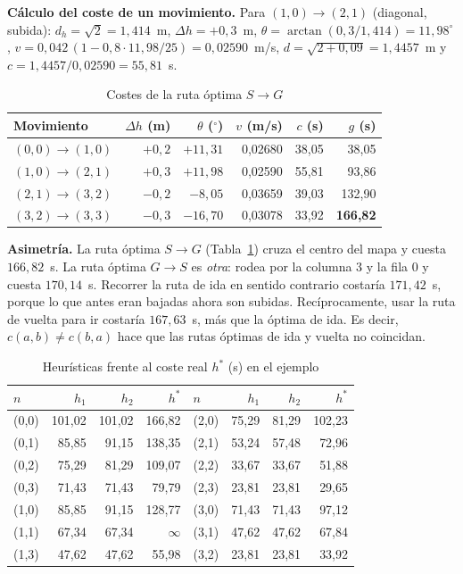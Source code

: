 \textbf{Cálculo del coste de un movimiento.} Para $(1,0) \to (2,1)$
(diagonal, subida):
$d_h = \sqrt{2} = 1{,}414$~m, $\Delta h = +0{,}3$~m,
$\theta = \arctan(0{,}3/1{,}414) = 11{,}98^\circ$,
$v = 0{,}042\,(1 - 0{,}8 \cdot 11{,}98/25) = 0{,}02590$~m/s,
$d = \sqrt{2 + 0{,}09} = 1{,}4457$~m y
$c = 1{,}4457/0{,}02590 = 55{,}81$~s.

\begin{table}[t]
  \centering
  \caption{Costes de la ruta óptima $S \to G$}
  \label{tab:ej3_ruta4x4}
  \footnotesize
  \begin{tabular}{@{}lrrrrr@{}}
    \toprule
    Movimiento & $\Delta h$ (m) & $\theta$ ($^\circ$) & $v$ (m/s) & $c$ (s) & $g$ (s) \\
    \midrule
    $(0,0)\to(1,0)$ & $+0{,}2$ & $+11{,}31$ & 0,02680 & 38,05 & 38,05 \\
    $(1,0)\to(2,1)$ & $+0{,}3$ & $+11{,}98$ & 0,02590 & 55,81 & 93,86 \\
    $(2,1)\to(3,2)$ & $-0{,}2$ & $-8{,}05$  & 0,03659 & 39,03 & 132,90 \\
    $(3,2)\to(3,3)$ & $-0{,}3$ & $-16{,}70$ & 0,03078 & 33,92 & \textbf{166,82} \\
    \bottomrule
  \end{tabular}
\end{table}

\textbf{Asimetría.} La ruta óptima $S \to G$ (Tabla~\ref{tab:ej3_ruta4x4})
cruza el centro del mapa y cuesta $166{,}82$~s. La ruta óptima $G \to S$ es
\emph{otra}: rodea por la columna 3 y la fila 0 y cuesta $170{,}14$~s.
Recorrer la ruta de ida en sentido contrario costaría $171{,}42$~s, porque lo
que antes eran bajadas ahora son subidas. Recíprocamente, usar la ruta de
vuelta para ir costaría $167{,}63$~s, más que la óptima de ida. Es decir,
$c(a,b) \neq c(b,a)$ hace que las rutas óptimas de ida y vuelta no coincidan.

\begin{table}[t]
  \centering
  \caption{Heurísticas frente al coste real $h^*$ (s) en el ejemplo}
  \label{tab:ej3_h4x4}
  \footnotesize
  \begin{tabular}{@{}lrrr|lrrr@{}}
    \toprule
    $n$ & $h_1$ & $h_2$ & $h^*$ & $n$ & $h_1$ & $h_2$ & $h^*$ \\
    \midrule
    (0,0) & 101,02 & 101,02 & 166,82 & (2,0) & 75,29 & 81,29 & 102,23 \\
    (0,1) & 85,85  & 91,15  & 138,35 & (2,1) & 53,24 & 57,48 & 72,96 \\
    (0,2) & 75,29  & 81,29  & 109,07 & (2,2) & 33,67 & 33,67 & 51,88 \\
    (0,3) & 71,43  & 71,43  & 79,79  & (2,3) & 23,81 & 23,81 & 29,65 \\
    (1,0) & 85,85  & 91,15  & 128,77 & (3,0) & 71,43 & 71,43 & 97,12 \\
    (1,1) & 67,34  & 67,34  & $\infty$ & (3,1) & 47,62 & 47,62 & 67,84 \\
    (1,3) & 47,62  & 47,62  & 55,98  & (3,2) & 23,81 & 23,81 & 33,92 \\
    \bottomrule
  \end{tabular}
\end{table}

